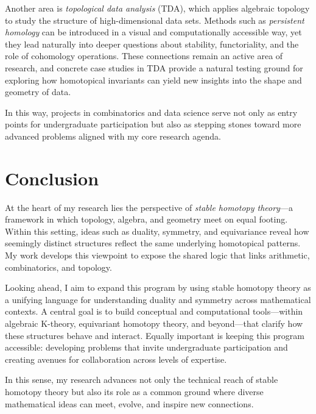 \documentclass[11pt]{article}
\begin{document}
Another area is {\it topological data analysis} (TDA), which applies algebraic topology to study the structure of high-dimensional data sets.
Methods such as {\it persistent homology} can be introduced in a visual and computationally accessible way, yet they lead naturally into deeper questions about stability, functoriality, and the role of cohomology operations.
These connections remain an active area of research, and concrete case studies in TDA provide a natural testing ground for exploring how homotopical invariants can yield new insights into the shape and geometry of data.

In this way, projects in combinatorics and data science serve not only as entry points for undergraduate participation but also as stepping stones toward more advanced problems aligned with my core research agenda.

\section{Conclusion}
At the heart of my research lies the perspective of {\it stable homotopy theory}—a framework in which topology, algebra, and geometry meet on equal footing.
Within this setting, ideas such as duality, symmetry, and equivariance reveal how seemingly distinct structures reflect the same underlying homotopical patterns.
My work develops this viewpoint to expose the shared logic that links arithmetic, combinatorics, and topology.

Looking ahead, I aim to expand this program by using stable homotopy theory as a unifying language for understanding duality and symmetry across mathematical contexts.
A central goal is to build conceptual and computational tools—within algebraic K-theory, equivariant homotopy theory, and beyond—that clarify how these structures behave and interact.
Equally important is keeping this program accessible: developing problems that invite undergraduate participation and creating avenues for collaboration across levels of expertise.

In this sense, my research advances not only the technical reach of stable homotopy theory but also its role as a common ground where diverse mathematical ideas can meet, evolve, and inspire new connections.



\end{document}
